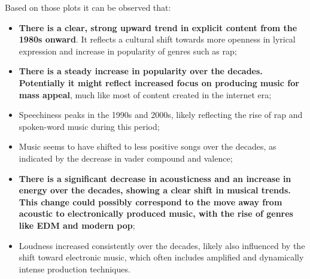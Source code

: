 Based on those plots it can be observed that:
\begin{itemize}
  \item \textbf{There is a clear, strong upward trend in explicit content from
    the 1980s onward}. It reflects a cultural shift  towards more openness in
    lyrical expression and increase in popularity of genres such as rap;
  \item \textbf{ There is a steady increase in popularity over the decades.
    Potentially it might reflect increased focus on  producing music for mass
  appeal}, much like most of content created in the internet era;
  \item Speechiness peaks in the 1990s and 2000s, likely reflecting the rise of
    rap and spoken-word music during this period;
  \item Music seems to have shifted to less  positive songs over the decades, as
    indicated by the decrease in vader compound and valence;
  \item \textbf{There is a significant decrease in acousticness and
      an increase in energy over the decades, showing a clear
      shift in musical trends. This change could possibly correspond to
      the move away from acoustic to electronically produced music, with the
      rise of genres like EDM and modern pop};
  \item Loudness increased consistently over the decades, likely also
    influenced by the shift toward electronic music, which often includes
    amplified and dynamically intense production techniques.
\end{itemize}
